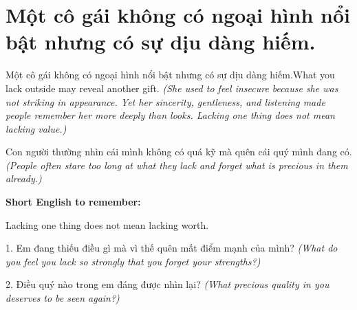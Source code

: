 \section{Một cô gái không có ngoại hình nổi bật nhưng có sự dịu dàng hiếm.}
\begin{truyen}{Một cô gái không có ngoại hình nổi bật nhưng có sự dịu dàng hiếm.}{What you lack outside may reveal another gift.}
\textit{(She used to feel insecure because she was not striking in appearance. Yet her sincerity, gentleness, and listening made people remember her more deeply than looks. Lacking one thing does not mean lacking value.)}
\end{truyen}
\begin{baihoc}
Con người thường nhìn cái mình không có quá kỹ mà quên cái quý mình đang có.
\textit{(People often stare too long at what they lack and forget what is precious in them already.)}
\end{baihoc}
\begin{ghinhoanh}
\textbf{Short English to remember:}

Lacking one thing does not mean lacking worth.
\end{ghinhoanh}
\begin{tuhocnhanh}
1. Em đang thiếu điều gì mà vì thế quên mất điểm mạnh của mình? \textit{(What do you feel you lack so strongly that you forget your strengths?)}

2. Điều quý nào trong em đáng được nhìn lại? \textit{(What precious quality in you deserves to be seen again?)}
\end{tuhocnhanh}
\ngancach

